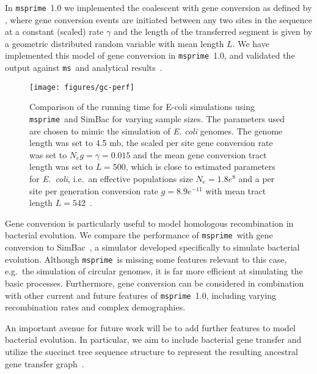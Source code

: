 \documentclass{article}
\newcommand{\msprime}[0]{\texttt{msprime}}
\newcommand{\ms}[0]{\texttt{ms}}
\begin{document}
In \msprime\ 1.0 we implemented the coalescent with gene conversion as defined by
\cite{wiuf2000coalescent}, where gene conversion events are initiated between any
two sites in the sequence at a constant (scaled) rate $\gamma$ and
the length of the transferred segment is given by a geometric distributed
random variable with mean length $L$.
We have implemented this model of gene
conversion in \msprime\ 1.0, and validated the output against
\ms\ and analytical results~\citep{wiuf2000coalescent}.

\begin{figure}
\begin{center}
\texttt{[image: figures/gc-perf]}
\end{center}
\caption{\label{fig-gc-perf}Comparison of the running time
for E-coli simulations using \msprime\ and SimBac for varying
sample sizes. The parameters used are chosen to mimic the simulation
of \textit{E. coli} genomes. The genome length was set to 4.5 mb, the scaled per site
gene conversion rate was set to $N_e g = \gamma = 0.015$ and
the mean gene conversion tract length was set to $L = 500$, which is close to
estimated parameters for \textit{E.\ coli}, i.e.\ an effective populations size
$N_e = 1.8e^8$ and a per site per generation conversion rate $g = 8.9e^{-11}$
with mean tract length $L = 542$~\citep{lapierre2016the}.}
\end{figure}

Gene conversion is particularly useful to model homologous recombination in
bacterial evolution.
We compare the performance of \msprime\ with gene conversion to
SimBac~\citep{brown2016simbac}, a simulator developed specifically to
simulate bacterial evolution. Although \msprime\ is missing some features
relevant to this case, e.g.\ the simulation of circular genomes, it is far
more efficient at simulating the basic processes.
Furthermore, gene conversion can be considered in combination
with other current and future features of \msprime\ 1.0,
including varying recombination rates and complex demographies.

An important avenue for future work
will be to add further features to model bacterial
evolution. In particular, we aim to include bacterial gene transfer and utilize
the succinct tree sequence structure to represent the resulting ancestral gene
transfer graph~\citep{baumdicker2014AGTG}.
\end{document}
